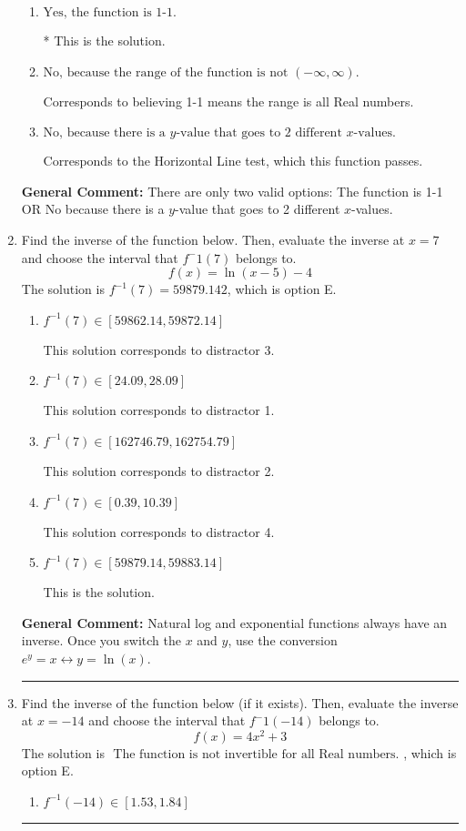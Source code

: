 \documentclass{extbook}[14pt]
\newcommand{\litem}[1]{\item #1

\rule{\textwidth}{0.4pt}}
\begin{document}
\begin{enumerate}
{\begin{enumerate}[label=\Alph*.]
Corresponds to believing 1-1 means the domain is all Real numbers.
\item \( \text{Yes, the function is 1-1.} \)

* This is the solution.
\item \( \text{No, because the range of the function is not $(-\infty, \infty)$.} \)

Corresponds to believing 1-1 means the range is all Real numbers.
\item \( \text{No, because there is a $y$-value that goes to 2 different $x$-values.} \)

Corresponds to the Horizontal Line test, which this function passes.
\end{enumerate}

\textbf{General Comment:} There are only two valid options: The function is 1-1 OR No because there is a $y$-value that goes to 2 different $x$-values.
}
\litem{
Find the inverse of the function below. Then, evaluate the inverse at $x = 7$ and choose the interval that $f^-1(7)$ belongs to.
\[ f(x) = \ln{(x-5)}-4 \]The solution is \( f^{-1}(7) = 59879.142 \), which is option E.\begin{enumerate}[label=\Alph*.]
\item \( f^{-1}(7) \in [59862.14, 59872.14] \)

 This solution corresponds to distractor 3.
\item \( f^{-1}(7) \in [24.09, 28.09] \)

 This solution corresponds to distractor 1.
\item \( f^{-1}(7) \in [162746.79, 162754.79] \)

 This solution corresponds to distractor 2.
\item \( f^{-1}(7) \in [0.39, 10.39] \)

 This solution corresponds to distractor 4.
\item \( f^{-1}(7) \in [59879.14, 59883.14] \)

 This is the solution.
\end{enumerate}

\textbf{General Comment:} Natural log and exponential functions always have an inverse. Once you switch the $x$ and $y$, use the conversion $ e^y = x \leftrightarrow y=\ln(x)$.
}
\litem{
Find the inverse of the function below (if it exists). Then, evaluate the inverse at $x = -14$ and choose the interval that $f^-1(-14)$ belongs to.
\[ f(x) = 4 x^2 + 3 \]The solution is \( \text{ The function is not invertible for all Real numbers. } \), which is option E.\begin{enumerate}[label=\Alph*.]
\item \( f^{-1}(-14) \in [1.53, 1.84] \)


\end{enumerate}}
\end{enumerate}
\end{document}
